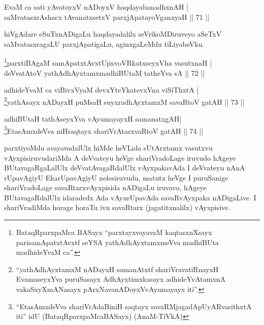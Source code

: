 
\begin{shl}
EvaM ca sati yAvatoyxV nADoyxV haqdayabanadhxnAH |\\
saMvatasxrAshacx tAvanatxsetxV parxjApatayoV\s ganxyaH \hfill || 71 || 
\end{shl}

\begin{artha}
hiVgAdare eSuTxnADigaLu haqdayadalilx seVrikoMDiruveyo aSeTxV saMvatasxragaLU parxjApatigaLu, aginxgaLeMdu tiLiyabeVku.
\end{artha}

\begin{shl}
\footnote{BataqRparxpaMca BASayx \mdash ``parxtayxvayavaM kaqtasxnXsayx parisamApatxtAvxtf seYSA yathA\s dhAyxtamxmeVva madhiBUta madhideYvaM ca''.}parxtiBAgaM samApatxtAvxtUpxvoVRkatxseyxVha vasutxnaH |\\
deVvatA\s toV yathA\s dhAyxtamxmadhiBUtaM tatheYva sA \hfill || 72 || 
\end{shl}


\begin{shl}
adhideYvaM ca viBivxVyaM devxYteYkatevxVna viSiThxtA |\\
\footnote{``yathA\s dhAyxtamxM nADayxH samanAtxtf shariVravatiRnayxH EvamaseyxYva puruSasayx AdhAyxtimxkasayx adhideYvAtamxnA vakaSxyXmANasayx pArxNavanADoyxVvAyumayayx iti''.}yathA\s sayx nADayxH puMsaH suyxradhAyxtamxM savaRtoV gatAH \hfill || 73 || 
\end{shl}

\begin{shl}
adhiBUtaH tathA\s seyxYva vAyumayayxH samanatxgAH|\\
\footnote{``EtasAmxdeVva shariVrAdaBiniH saqtayx savaRMjagadApUyARvasithxtA iti'' idU (BataqRparxpaMcaBASayx) (AnaM-TiVkA)}EtasAmxdeVva niHsaqtayx shariVrAtasxvaRtoV gatAH \hfill || 74 ||
\end{shl}

\begin{artha}
parxtiyoMdu avayavadalUlx hiMde heVLida sUtArxtamx vasutxvu vAyxpisiruvudariMda A deVvateyu heVge shariVradoLage iruvudo hAgeye BUtavagaRgaLalUlx deVvatAvagaRdalUlx vAyxpakavAda I deVvateyu nAnA rUpavAgiyU EkarUpavAgiyU nelesiruvudu, matutx heVge I puruSanige shariVradoLage savaRtarxvAyxpisida nADigaLu iruvavo, hAgeye BUtavagaRdalUlx idaradedx Ada vAyurUpavAda savaRvAyxpaka nADigaLive. I shariVradiMda horage horaTu ivu savaRtarx (jagatitxnalilx) vAyxpisive.
\end{artha}

